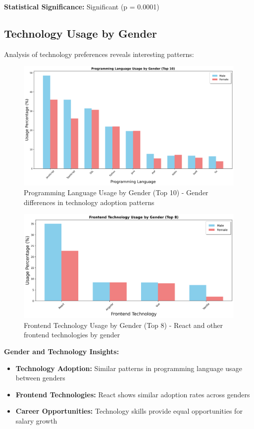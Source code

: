 \documentclass[12pt,a4paper]{article}
\begin{document}
\textbf{Statistical Significance:} Significant (p = 0.0001)

\subsection{Technology Usage by Gender}
Analysis of technology preferences reveals interesting patterns:

\begin{figure}[H]
    \centering
    \includegraphics[width=\textwidth]{figures/barplot_gender_programming.png}
    \caption{Programming Language Usage by Gender (Top 10) - Gender differences in technology adoption patterns}
\end{figure}

\begin{figure}[H]
    \centering
    \includegraphics[width=\textwidth]{figures/barplot_gender_frontend.png}
    \caption{Frontend Technology Usage by Gender (Top 8) - React and other frontend technologies by gender}
\end{figure}

\textbf{Gender and Technology Insights:}
\begin{itemize}
    \item \textbf{Technology Adoption:} Similar patterns in programming language usage between genders
    \item \textbf{Frontend Technologies:} React shows similar adoption rates across genders
    \item \textbf{Career Opportunities:} Technology skills provide equal opportunities for salary growth
\end{itemize}
\end{document}

